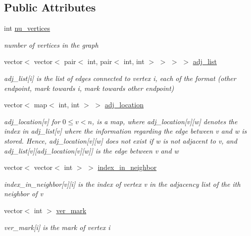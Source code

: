 \subsection*{Public Attributes}
\begin{DoxyCompactItemize}
\item 
int \hyperlink{classmarked__graph_acf79c6aeb8f32614cb14a5baaa6c9f9b}{nu\+\_\+vertices}
\begin{DoxyCompactList}\small\item\em number of vertices in the graph \end{DoxyCompactList}\item 
vector$<$ vector$<$ pair$<$ int, pair$<$ int, int $>$ $>$ $>$ $>$ \hyperlink{classmarked__graph_a1a0bf7ca413a278763f7c878b3b6fd6f}{adj\+\_\+list}
\begin{DoxyCompactList}\small\item\em adj\+\_\+list\mbox{[}i\mbox{]} is the list of edges connected to vertex i, each of the format (other endpoint, mark towards i, mark towards other endpoint) \end{DoxyCompactList}\item 
vector$<$ map$<$ int, int $>$ $>$ \hyperlink{classmarked__graph_a3ae722ea9583ad23af34d789a88ac01a}{adj\+\_\+location}
\begin{DoxyCompactList}\small\item\em adj\+\_\+location\mbox{[}v\mbox{]} for $0 \leq v < n$, is a map, where adj\+\_\+location\mbox{[}v\mbox{]}\mbox{[}w\mbox{]} denotes the index in adj\+\_\+list\mbox{[}v\mbox{]} where the information regarding the edge between v and w is stored. Hence, adj\+\_\+location\mbox{[}v\mbox{]}\mbox{[}w\mbox{]} does not exist if w is not adjacent to v, and adj\+\_\+list\mbox{[}v\mbox{]}\mbox{[}adj\+\_\+location\mbox{[}v\mbox{]}\mbox{[}w\mbox{]}\mbox{]} is the edge between v and w \end{DoxyCompactList}\item 
vector$<$ vector$<$ int $>$ $>$ \hyperlink{classmarked__graph_aee10b537408de42476609c1e45c075d0}{index\+\_\+in\+\_\+neighbor}
\begin{DoxyCompactList}\small\item\em index\+\_\+in\+\_\+neighbor\mbox{[}v\mbox{]}\mbox{[}i\mbox{]} is the index of vertex v in the adjacency list of the ith neighbor of v \end{DoxyCompactList}\item 
vector$<$ int $>$ \hyperlink{classmarked__graph_ac83e9377dd4d8bb95be1ac949b127296}{ver\+\_\+mark}
\begin{DoxyCompactList}\small\item\em ver\+\_\+mark\mbox{[}i\mbox{]} is the mark of vertex i \end{DoxyCompactList}\end{DoxyCompactItemize}
